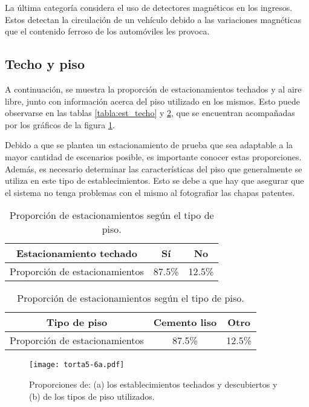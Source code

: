 La última categoría considera el uso de detectores magnéticos en los ingresos. Estos detectan la circulación de un vehículo debido a las variaciones magnéticas que el contenido ferroso de los automóviles les provoca. 

\subsection{Techo y piso}
A continuación, se muestra la proporción de estacionamientos techados y al aire libre, junto con información acerca del piso utilizado en los mismos. Esto puede observarse en las tablas \ref{tabla:est_techo} y \ref{tabla:est_piso}, que se encuentran acompañadas por los gráficos de la figura \ref{fig:img_torta5-6a}.

Debido a que se plantea un estacionamiento de prueba que sea adaptable a la mayor cantidad de escenarios posible, es importante conocer estas proporciones. Además, es necesario determinar las características del piso que generalmente se utiliza en este tipo de establecimientos. Esto se debe a que hay que asegurar que el sistema no tenga problemas con el mismo al fotografiar las chapas patentes.

\begin{table}[htbp]
	\begin{center}
		\begin{tabular}{|c|c|c|}
			\hline
			Estacionamiento techado & Sí & No\\
			\hline \hline
			Proporción de estacionamientos & 87.5\% & 12.5\% \\ \hline
		\end{tabular}
		\caption{Proporción de estacionamientos techados y al aire libre dentro de la muestra.}
		\label{tabla:est_techo}
	\end{center}
	\quad
	\begin{center}
		\begin{tabular}{|c|c|c|}
			\hline
			Tipo de piso & Cemento liso & Otro\\
			\hline \hline
			Proporción de estacionamientos & 87.5\% & 12.5\% \\ \hline
		\end{tabular}
		\caption{Proporción de estacionamientos según el tipo de piso.}
		\label{tabla:est_piso}
	\end{center}
\end{table}

\begin{figure}[htb]
	\centering
	\texttt{[image: torta5-6a.pdf]}
	\caption{Proporciones de: (a) los establecimientos techados y descubiertos y (b) de los tipos de piso utilizados.}
	\label{fig:img_torta5-6a}
\end{figure}


